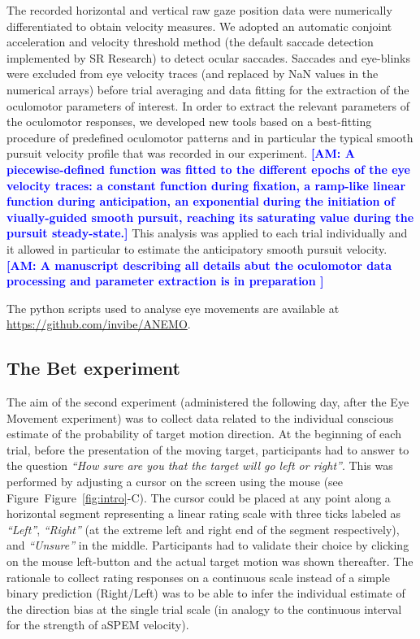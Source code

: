 \documentclass[12pt,english]{article}%
\newcommand{\seeFig}[1]{Figure~\ref{fig:#1}}
\newcommand{\AM}[1]{\textbf{\textcolor{blue}{[AM: #1]}}}
\begin{document}
The recorded horizontal and vertical raw gaze position data were numerically differentiated to obtain velocity measures. We adopted an automatic conjoint acceleration and velocity threshold method (the default saccade detection implemented by SR Research) to detect ocular saccades. Saccades and eye-blinks were excluded from eye velocity traces (and replaced by NaN values in the numerical arrays) before trial averaging and data fitting for the extraction of the oculomotor parameters of interest.
In order to extract the relevant parameters of the oculomotor responses, we developed new tools based on a best-fitting procedure of predefined oculomotor patterns and in particular the typical smooth pursuit velocity profile that was recorded in our experiment. \AM{A piecewise-defined function was fitted to the different epochs of the eye velocity traces: a constant function during fixation, a ramp-like linear function during anticipation, an exponential during the initiation of viually-guided smooth pursuit, reaching its saturating value during the pursuit steady-state.} This analysis was applied to each trial individually and it allowed in particular to estimate the anticipatory smooth pursuit velocity. \AM{A manuscript describing all details abut the oculomotor data processing and parameter extraction is in preparation }

The python scripts used to analyse eye movements are available at \url{https://github.com/invibe/ANEMO}.

\subsection{The Bet experiment}
The aim of the second experiment (administered the following day, after the Eye Movement experiment) was to collect data related to the individual conscious estimate of the probability of target motion direction. At the beginning of each trial, before the presentation of the moving target, participants had to answer to the question \textit{ ``How sure are you that the target will go left or right''}. This was performed by adjusting a cursor on the screen using the mouse (see Figure~\seeFig{intro}-C). The cursor could be placed at any point along a horizontal segment representing a linear rating scale with three ticks labeled as \textit{ ``Left''}, \textit{``Right''} (at the extreme left and right end of the segment respectively), and \textit{``Unsure''} in the middle. Participants had to validate their choice by clicking on the mouse left-button and the actual target motion was shown thereafter. The rationale to collect rating responses on a continuous scale instead of a simple binary prediction (Right/Left) was to be able to infer the individual estimate of the direction bias at the single trial scale (in analogy to the continuous interval for the strength of aSPEM velocity).
\end{document}
